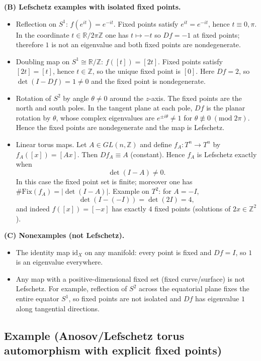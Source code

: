 \documentclass[12pt,a4paper]{article}
\theoremstyle{plain}
\theoremstyle{definition}      %
\begin{document}
\medskip
\noindent\textbf{(B) Lefschetz examples with isolated fixed points.}
\begin{itemize}
	\item Reflection on $S^1$: $f(e^{it})=e^{-it}$.
	Fixed points satisfy $e^{it}=e^{-it}$, hence $t\equiv 0,\pi$.
	In the coordinate $t\in\mathbb{R}/2\pi\mathbb{Z}$ one has $t\mapsto -t$ so $Df=-1$ at fixed points;
	therefore $1$ is not an eigenvalue and both fixed points are nondegenerate.
	
	\item Doubling map on $S^1\cong \mathbb{R}/\mathbb{Z}$: $f([t])=[2t]$.
	Fixed points satisfy $[2t]=[t]$, hence $t\in\mathbb{Z}$, so the unique fixed point is $[0]$.
	Here $Df=2$, so $\det(I-Df)=1\neq 0$ and the fixed point is nondegenerate.
	
	\item Rotation of $S^2$ by angle $\theta\neq 0$ around the $z$-axis.
	The fixed points are the north and south poles.
	In the tangent plane at each pole, $Df$ is the planar rotation by $\theta$,
	whose complex eigenvalues are $e^{\pm i\theta}\neq 1$ for $\theta\not\equiv 0\;(\mathrm{mod}\;2\pi)$.
	Hence the fixed points are nondegenerate and the map is Lefschetz.
	
	\item Linear torus maps.
	Let $A\in GL(n,\mathbb{Z})$ and define $f_A:T^n\to T^n$ by $f_A([x])=[Ax]$.
	Then $Df_A\equiv A$ (constant). Hence $f_A$ is Lefschetz exactly when
	\[
	\det(I-A)\neq 0.
	\]
	In this case the fixed point set is finite; moreover one has $\#\mathrm{Fix}(f_A)=|\det(I-A)|$.
	Example on $T^2$: for $A=-I$,
	\[
	\det(I-(-I))=\det(2I)=4,
	\]
	and indeed $f([x])=[-x]$ has exactly $4$ fixed points (solutions of $2x\in\mathbb{Z}^2$).
\end{itemize}

\medskip
\noindent\textbf{(C) Nonexamples (not Lefschetz).}
\begin{itemize}
	\item The identity map $\mathrm{id}_X$ on any manifold: every point is fixed and $Df=I$, so $1$ is an eigenvalue everywhere.
	\item Any map with a positive-dimensional fixed set (fixed curve/surface) is not Lefschetz.
	For example, reflection of $S^2$ across the equatorial plane fixes the entire equator $S^1$,
	so fixed points are not isolated and $Df$ has eigenvalue $1$ along tangential directions.
\end{itemize}


\subsection*{Example (Anosov/Lefschetz torus automorphism with explicit fixed points)}
\end{document}
